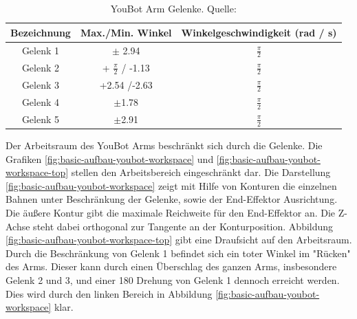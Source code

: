    \begin{table}[H]
   	\begin{tabular}{|c|c|c|}
   		\hline Bezeichnung & Max./Min. Winkel & Winkelgeschwindigkeit (rad / s) \\ 
   		\hline Gelenk 1 & $\pm$ 2.94 & $\frac{\pi}{2}$  \\ 
   		\hline Gelenk 2 & + $\frac{\pi}{2}$ / -1.13  & $\frac{\pi}{2}$ \\ 
   		\hline Gelenk 3 & +2.54 /-2.63 & $\frac{\pi}{2}$ \\ 
   		\hline Gelenk 4 & $\pm$1.78 & $\frac{\pi}{2}$ \\ 
   		\hline Gelenk 5 & $\pm$2.91 & $\frac{\pi}{2}$ \\ 
   		\hline 
   	\end{tabular}
   	\caption[YouBot Arm Gelenke]{YouBot Arm Gelenke. Quelle: \cite{monikaflorekjasinska2015}}
   	\label{tab:basic-aufbau-youbot-joints}
   \end{table}
   
   Der Arbeitsraum des YouBot Arms beschränkt sich durch die Gelenke. Die Grafiken \ref{fig:basic-aufbau-youbot-workspace} und \ref{fig:basic-aufbau-youbot-workspace-top} stellen den Arbeitsbereich eingeschränkt dar. Die Darstellung \ref{fig:basic-aufbau-youbot-workspace} zeigt mit Hilfe von Konturen die einzelnen Bahnen unter Beschränkung der Gelenke, sowie der End-Effektor Ausrichtung.  Die äußere Kontur gibt die maximale Reichweite für den End-Effektor an. Die Z-Achse steht dabei orthogonal zur Tangente an der Konturposition. Abbildung \ref{fig:basic-aufbau-youbot-workspace-top} gibt eine Draufsicht auf den Arbeitsraum. Durch die Beschränkung von Gelenk 1 befindet sich ein toter Winkel im "Rücken" des Arms. Dieser kann durch einen Überschlag des ganzen Arms, insbesondere Gelenk 2 und 3, und einer 180 \textdegree Drehung von Gelenk 1 dennoch erreicht werden. Dies wird durch den linken Bereich in Abbildung \ref{fig:basic-aufbau-youbot-workspace} klar.
   
